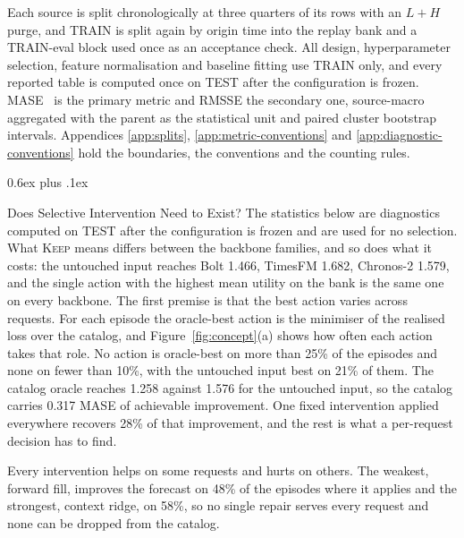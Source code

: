 \documentclass{article}
\makeatletter
\def\subsection{\@startsection{subsection}{2}{\z@}{-1.4ex plus -0.4ex minus -.2ex}%
  {0.6ex plus .1ex}{\normalsize\sc\raggedright}}
\makeatother
\begin{document}
Each source is split chronologically at three quarters of its rows with an $L + H$ purge, and
TRAIN is split again by origin time into the replay bank and a TRAIN-eval block used once as an
acceptance check. All design, hyperparameter selection, feature normalisation and baseline
fitting use TRAIN only, and every reported table is computed once on TEST after the
configuration is frozen. MASE~\citep{hyndman2006mase} is the primary metric and RMSSE the
secondary one, source-macro aggregated with the parent as the statistical unit and paired
cluster bootstrap intervals. Appendices \ref{app:splits}, \ref{app:metric-conventions} and
\ref{app:diagnostic-conventions} hold the boundaries, the conventions and the counting rules.

\subsection{Does Selective Intervention Need to Exist?}
\label{sec:exp-exists}
The statistics below are diagnostics computed on TEST after the configuration is frozen and
are used for no selection. What \textsc{Keep} means differs between the backbone families, and so does what it costs: the untouched input reaches Bolt 1.466, TimesFM 1.682, Chronos-2 1.579, and the single action with the highest mean utility on the bank is the same one on every backbone. The first premise is that the best action
varies across requests.
For each episode the oracle-best action is the minimiser of the realised loss over the catalog,
and Figure~\ref{fig:concept}(a) shows how often each action takes that role. No action is oracle-best on more than 25\% of the episodes and none on fewer than 10\%, with the untouched input best on 21\% of them. The catalog oracle reaches 1.258 against 1.576 for the untouched input, so the catalog carries 0.317 MASE of achievable improvement. One fixed intervention applied everywhere recovers 28\% of that improvement, and the rest is what a per-request decision has to find.

Every intervention helps on some requests and hurts on others. The weakest, forward fill, improves the forecast on 48\% of the episodes where it applies and the strongest, context ridge, on 58\%, so no single repair serves every request and none can be dropped from the catalog.
\end{document}
